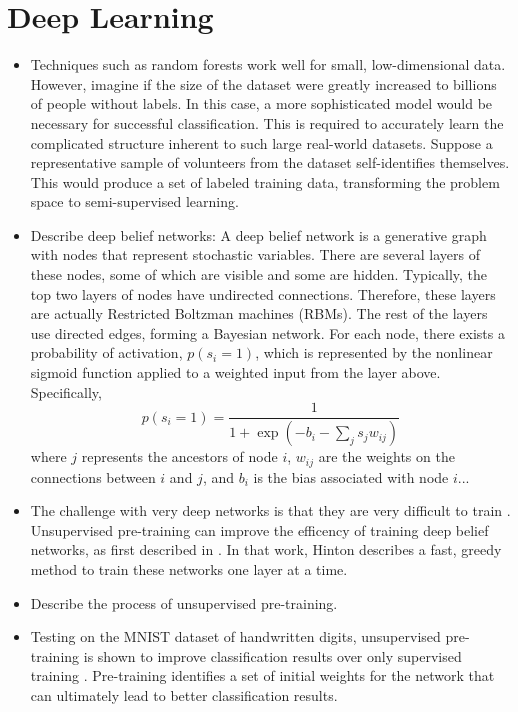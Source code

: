 \documentclass[12pt]{report}
\begin{document}
\section{Deep Learning}
\begin{itemize}
\item Techniques such as random forests work well for small, low-dimensional data.  However, imagine if the size of the dataset were greatly increased to billions of people without labels.  In this case, a more sophisticated model would be necessary for successful classification.  This is required to accurately learn the complicated structure inherent to such large real-world datasets.
Suppose a representative sample of volunteers from the dataset self-identifies themselves.
This would produce a set of labeled training data, transforming the problem space to semi-supervised learning. 
\item Describe deep belief networks: A deep belief network is a generative graph with nodes that represent stochastic variables.
There are several layers of these nodes, some of which are visible and some are hidden.
Typically, the top two layers of nodes have undirected connections.
Therefore, these layers are actually Restricted Boltzman machines (RBMs).
The rest of the layers use directed edges, forming a Bayesian network.
For each node, there exists a probability of activation, $p(s_i=1)$, which is represented by the nonlinear sigmoid function applied to a weighted input from the layer above.
Specifically,
\begin{equation}
p(s_i=1) = \frac{1}{1+\exp \left(-b_i-\sum_j s_j w_{ij}\right)}
\end{equation}
where $j$ represents the ancestors of node $i$, $w_{ij}$ are the weights on the connections between $i$ and $j$, and $b_i$ is the bias associated with node $i$...
\item The challenge with very deep networks is that they are very difficult to train \cite{bengio_learning_2009}.
Unsupervised pre-training can improve the efficency of training deep belief networks, as first described in \cite{hinton_recognize_2007}.
In that work, Hinton describes a fast, greedy method to train these networks one layer at a time.  
\item 
Describe the process of unsupervised pre-training.
\item Testing on the MNIST dataset of handwritten digits, unsupervised pre-training is shown to improve classification results over only supervised training  \cite{erhan_why_2010}. 
Pre-training identifies a set of initial weights for the network that can ultimately lead to better classification results.  

\end{itemize}
\end{document}
